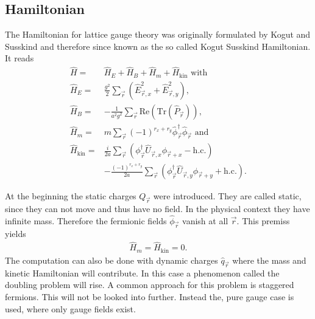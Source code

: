 \subsection{Hamiltonian}
The Hamiltonian for lattice gauge theory was originally formulated by Kogut and Susskind \cite{PhysRevD.11.395} and therefore since known as the so called Kogut Susskind Hamiltonian. It reads
\begin{align*}
	\hat{H}            = & \hat{H}_E+\hat{H}_B+\hat{H}_m+\hat{H}_{\text{kin}}\text{ with}                                                              \\
	\hat{H}_E          = & \frac{g^2}{2}\sum_{\vec{r}} \left(\hat{E}^2_{\vec{r},x}+\hat{E}^2_{\vec{r},y}\right),                                       \\
  \hat{H}_B          = & -\frac{1}{a^2g^2}\sum_{\vec{r}} \text{Re}(\text{Tr}(\hat{P}_{\vec{r}})),                                     \\
	\hat{H}_m          = & m\sum_{\vec{r}}(-1)^{r_x+r_y}\hat{\phi}^{\dag}_{\vec{r}}\hat{\phi}_{\vec{r}}\text{ and}                                     \\
	\hat{H}_\text{kin} = & \frac{i}{2a}\sum_{\vec{r}}\left(\phi^{\dag}_{\vec{r}}\hat{U}_{\vec{r}, x}\phi_{\vec{r}+x}-\text{h.c.}\right)                \\
	                     & -\frac{(-1)^{r_x+r_y}}{2a}\sum_{\vec{r}}\left(\phi^{\dag}_{\vec{r}}\hat{U}_{\vec{r}, y}\phi_{\vec{r}+y}+\text{h.c.}\right).
\end{align*}

At the beginning the static charges $Q_{\vec{r}}$ were introduced. They are called static, since they can not move and thus have no field. In the physical context they have infinite mass. Therefore the fermionic fields $\hat{\phi}_{\vec{r}}$ vanish at all $\vec{r}$. This premiss yields
\begin{align*}
	\hat{H}_{m}=\hat{H}_{\text{kin}}=0.
\end{align*}
The computation can also be done with dynamic charges $\hat{q}_{\vec{r}}$ where the mass and kinetic Hamiltonian will contribute. In this case a phenomenon called the doubling problem will rise. A common approach for this problem is staggered fermions. This will not be looked into further. Instead the, pure gauge case is used, where only gauge fields exist.

